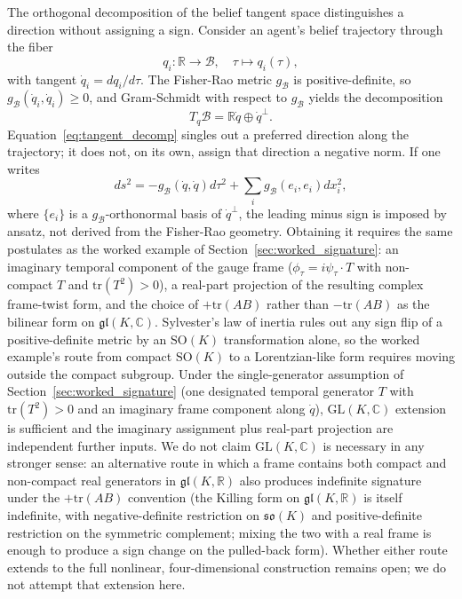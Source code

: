 \documentclass[11pt]{article}
\begin{document}
The orthogonal decomposition of the belief tangent space distinguishes a direction without assigning a sign. Consider an agent's belief trajectory through the fiber
\begin{equation}
q_i: \mathbb{R} \to \mathcal{B}, \quad \tau \mapsto q_i(\tau),
\end{equation}
with tangent $\dot{q}_i = dq_i/d\tau$. The Fisher-Rao metric $g_{\mathcal{B}}$ is positive-definite, so $g_{\mathcal{B}}(\dot{q}_i, \dot{q}_i) \geq 0$, and Gram-Schmidt with respect to $g_{\mathcal{B}}$ yields the decomposition
\begin{equation}
T_q\mathcal{B} = \mathbb{R}\dot{q} \oplus \dot{q}^\perp.
\label{eq:tangent_decomp}
\end{equation}
Equation~\eqref{eq:tangent_decomp} singles out a preferred direction along the trajectory; it does not, on its own, assign that direction a negative norm. If one writes
\begin{equation}
ds^2 = -g_{\mathcal{B}}(\dot{q}, \dot{q}) d\tau^2 + \sum_i g_{\mathcal{B}}(e_i, e_i) dx_i^2,
\label{eq:lor_belief_metric}
\end{equation}
where $\{e_i\}$ is a $g_{\mathcal{B}}$-orthonormal basis of $\dot{q}^\perp$, the leading minus sign is imposed by ansatz, not derived from the Fisher-Rao geometry. Obtaining it requires the same postulates as the worked example of Section~\ref{sec:worked_signature}: an imaginary temporal component of the gauge frame ($\phi_\tau = i\psi_\tau \cdot T$ with non-compact $T$ and $\mathrm{tr}(T^2) > 0$), a real-part projection of the resulting complex frame-twist form, and the choice of $+\mathrm{tr}(AB)$ rather than $-\mathrm{tr}(AB)$ as the bilinear form on $\mathfrak{gl}(K, \mathbb{C})$. Sylvester's law of inertia rules out any sign flip of a positive-definite metric by an $\mathrm{SO}(K)$ transformation alone, so the worked example's route from compact $\mathrm{SO}(K)$ to a Lorentzian-like form requires moving outside the compact subgroup. Under the single-generator assumption of Section~\ref{sec:worked_signature} (one designated temporal generator $T$ with $\mathrm{tr}(T^2) > 0$ and an imaginary frame component along $\dot{q}$), $\mathrm{GL}(K, \mathbb{C})$ extension is sufficient and the imaginary assignment plus real-part projection are independent further inputs. We do not claim $\mathrm{GL}(K, \mathbb{C})$ is necessary in any stronger sense: an alternative route in which a frame contains both compact and non-compact real generators in $\mathfrak{gl}(K, \mathbb{R})$ also produces indefinite signature under the $+\mathrm{tr}(AB)$ convention (the Killing form on $\mathfrak{gl}(K, \mathbb{R})$ is itself indefinite, with negative-definite restriction on $\mathfrak{so}(K)$ and positive-definite restriction on the symmetric complement; mixing the two with a real frame is enough to produce a sign change on the pulled-back form). Whether either route extends to the full nonlinear, four-dimensional construction remains open; we do not attempt that extension here.
\end{document}
